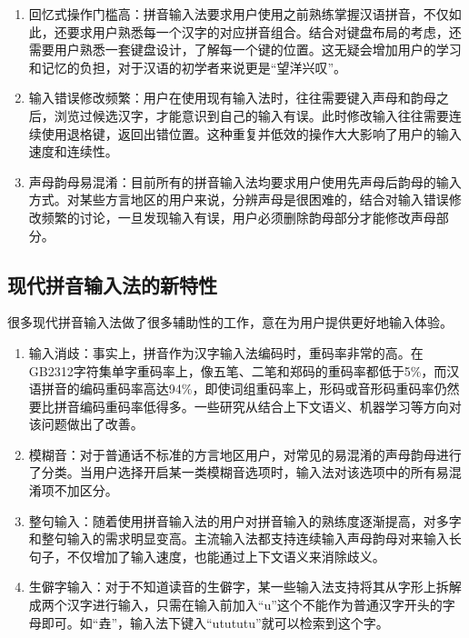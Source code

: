 \begin{enumerate}
  \item
  回忆式操作门槛高：拼音输入法要求用户使用之前熟练掌握汉语拼音，不仅如此，还要求用户熟悉每一个汉字的对应拼音组合。结合对键盘布局的考虑，还需要用户熟悉一套键盘设计，了解每一个键的位置。这无疑会增加用户的学习和记忆的负担，对于汉语的初学者来说更是“望洋兴叹”。

  \item
  输入错误修改频繁：用户在使用现有输入法时，往往需要键入声母和韵母之后，浏览过候选汉字，才能意识到自己的输入有误。此时修改输入往往需要连续使用退格键，返回出错位置。这种重复并低效的操作大大影响了用户的输入速度和连续性。

  \item
  声母韵母易混淆：目前所有的拼音输入法均要求用户使用先声母后韵母的输入方式。对某些方言地区的用户来说，分辨声母是很困难的，结合对输入错误修改频繁的讨论，一旦发现输入有误，用户必须删除韵母部分才能修改声母部分。
  \end{enumerate}

  \subsection{现代拼音输入法的新特性\label{sec:new_feature}}

  很多现代拼音输入法做了很多辅助性的工作，意在为用户提供更好地输入体验。

  \begin{enumerate}

  \item
  输入消歧：事实上，拼音作为汉字输入法编码时，重码率非常的高。在GB2312字符集单字重码率上，像五笔、二笔和郑码的重码率都低于5\%，而汉语拼音的编码重码率高达94\%，即使词组重码率上，形码或音形码重码率仍然要比拼音编码重码率低得多。一些研究从结合上下文语义、机器学习等方向对该问题做出了改善。\supercite{wen2008ambiguity, liu2002approach}

  \item
  模糊音：对于普通话不标准的方言地区用户，对常见的易混淆的声母韵母进行了分类。当用户选择开启某一类模糊音选项时，输入法对该选项中的所有易混淆项不加区分。

  \item
  整句输入：随着使用拼音输入法的用户对拼音输入的熟练度逐渐提高，对多字和整句输入的需求明显变高。主流输入法都支持连续输入声母韵母对来输入长句子，不仅增加了输入速度，也能通过上下文语义来消除歧义。

  \item
  生僻字输入：对于不知道读音的生僻字，某一些输入法支持将其从字形上拆解成两个汉字进行输入，只需在输入前加入“u”这个不能作为普通汉字开头的字母即可。如“垚”，输入法下键入“utututu”就可以检索到这个字。
  \end{enumerate}

